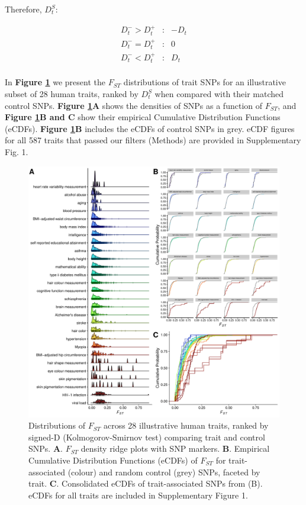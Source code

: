 \documentclass[
  9pt,
]{book}
\begin{document}
Therefore, \({D_t^S}\):

\[
\begin{aligned}
D_t^- > D_t^+ &: &-D_t \\
D_t^- = D_t^+ &: &0 \\
D_t^- < D_t^+ &: &D_t \\
\end{aligned}
\]

In \textbf{Figure \ref{fig:FstMain}} we present the \(F_{ST}\) distributions of trait SNPs for an illustrative subset of 28 human traits, ranked by \({D_t^S}\) when compared with their matched control SNPs. \textbf{Figure \ref{fig:FstMain}A} shows the densities of SNPs as a function of \(F_{ST}\), and \textbf{Figure \ref{fig:FstMain}B and C} show their empirical Cumulative Distribution Functions (eCDFs). \textbf{Figure \ref{fig:FstMain}B} includes the eCDFs of control SNPs in grey. eCDF figures for all 587 traits that passed our filters (Methods) are provided in Supplementary Fig. 1.



\begin{figure}
\includegraphics[width=1\linewidth]{figs/fst/20220314_final_0.1_1000} \caption{Distributions of \(F_{ST}\) across 28 illustrative human traits, ranked by signed-D (Kolmogorov-Smirnov test) comparing trait and control SNPs. \textbf{A}. \(F_{ST}\) density ridge plots with SNP markers. \textbf{B}. Empirical Cumulative Distribution Functions (eCDFs) of \(F_{ST}\) for trait-associated (colour) and random control (grey) SNPs, faceted by trait. \textbf{C}. Consolidated eCDFs of trait-associated SNPs from (B). eCDFs for all traits are included in Supplementary Figure 1.}\label{fig:FstMain}
\end{figure}
\end{document}
